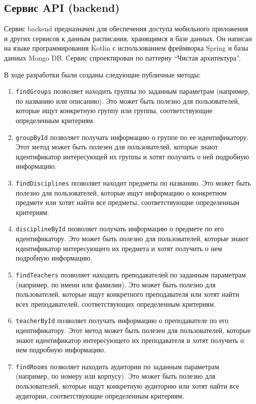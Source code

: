 \subsection{Сервис API (backend)}

Сервис backend предназначен для обеспечения доступа мобильного приложения и других сервисов
к данным расписания, хранящимся в базе данных. Он написан на языке программирования Kotlin с использованием фреймворка Spring и базы данных Mongo DB.
Сервис спроектирован по паттерну “Чистая архитектура”.

В ходе разработки были созданы следующие публичные методы:
\begin{enumerate}
\item \texttt{findGroups} позволяет находить группы по заданным параметрам (например, по названию или описанию). 
Это может быть полезно для пользователей, которые ищут конкретную группу или группы, соответствующие определенным критериям.
\item \texttt{groupById} позволяет получать информацию о группе по ее идентификатору. 
Этот метод может быть полезен для пользователей, которые знают идентификатор интересующей их группы и хотят получить о ней подробную информацию.
\item \texttt{findDisciplines} позволяет находит предметы по названию. 
Это может быть полезно для пользователей, которые ищут информацию о конкретном предмете или хотят найти все предметы, соответствующие определенным критериям.
\item \texttt{disciplineById} позволяет получать информацию о предмете по его идентификатору. 
Это может быть полезно для пользователей, которые знают идентификатор интересующего их предмета и хотят получить о нем подробную информацию.
\item \texttt{findTeachers} позволяет находить преподавателей по заданным параметрам (например, по имени или фамилии). 
Это может быть полезно для пользователей, которые ищут конкретного преподавателя или хотят найти всех преподавателей, соответствующих определенным критериям.
\item \texttt{teacherById} позволяет получать информацию о преподавателе по его идентификатору. 
Этот метод может быть полезен для пользователей, которые знают идентификатор интересующего их преподавателя и хотят получить о нем подробную информацию.
\item \texttt{findRooms} позволяет находить аудитории по заданным параметрам (например, по номеру или корпусу). 
Это может быть полезно для пользователей, которые ищут конкретную аудиторию или хотят найти все аудитории, соответствующие определенным критериям.

\end{enumerate}
